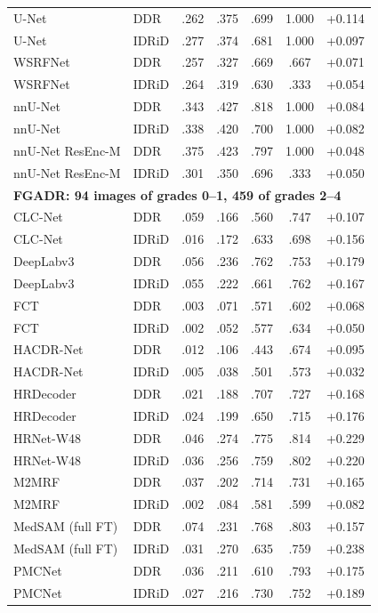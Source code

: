{\begin{longtable}{l l c c c c c}
U-Net & DDR & .262 & .375 & .699 & 1.000 & +0.114 \\
U-Net & IDRiD & .277 & .374 & .681 & 1.000 & +0.097 \\
WSRFNet & DDR & .257 & .327 & .669 & .667 & +0.071 \\
WSRFNet & IDRiD & .264 & .319 & .630 & .333 & +0.054 \\
nnU-Net & DDR & .343 & .427 & .818 & 1.000 & +0.084 \\
nnU-Net & IDRiD & .338 & .420 & .700 & 1.000 & +0.082 \\
nnU-Net ResEnc-M & DDR & .375 & .423 & .797 & 1.000 & +0.048 \\
nnU-Net ResEnc-M & IDRiD & .301 & .350 & .696 & .333 & +0.050 \\
\multicolumn{7}{l}{\textbf{FGADR: 94 images of grades 0--1, 459 of grades 2--4}}\\
CLC-Net & DDR & .059 & .166 & .560 & .747 & +0.107 \\
CLC-Net & IDRiD & .016 & .172 & .633 & .698 & +0.156 \\
DeepLabv3 & DDR & .056 & .236 & .762 & .753 & +0.179 \\
DeepLabv3 & IDRiD & .055 & .222 & .661 & .762 & +0.167 \\
FCT & DDR & .003 & .071 & .571 & .602 & +0.068 \\
FCT & IDRiD & .002 & .052 & .577 & .634 & +0.050 \\
HACDR-Net & DDR & .012 & .106 & .443 & .674 & +0.095 \\
HACDR-Net & IDRiD & .005 & .038 & .501 & .573 & +0.032 \\
HRDecoder & DDR & .021 & .188 & .707 & .727 & +0.168 \\
HRDecoder & IDRiD & .024 & .199 & .650 & .715 & +0.176 \\
HRNet-W48 & DDR & .046 & .274 & .775 & .814 & +0.229 \\
HRNet-W48 & IDRiD & .036 & .256 & .759 & .802 & +0.220 \\
M2MRF & DDR & .037 & .202 & .714 & .731 & +0.165 \\
M2MRF & IDRiD & .002 & .084 & .581 & .599 & +0.082 \\
MedSAM (full FT) & DDR & .074 & .231 & .768 & .803 & +0.157 \\
MedSAM (full FT) & IDRiD & .031 & .270 & .635 & .759 & +0.238 \\
PMCNet & DDR & .036 & .211 & .610 & .793 & +0.175 \\
PMCNet & IDRiD & .027 & .216 & .730 & .752 & +0.189 \\

\end{longtable}}
